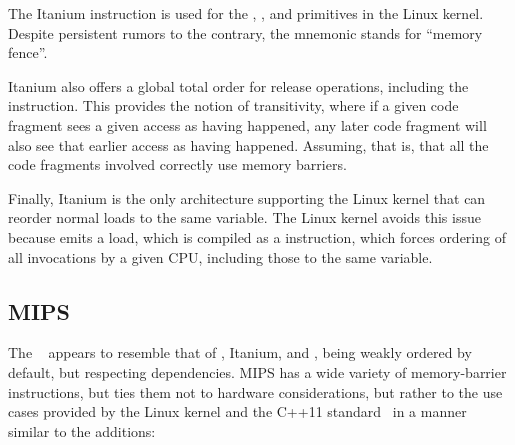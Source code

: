 The Itanium  instruction is used for the ,
, and  primitives in the Linux kernel.
Despite persistent rumors to the contrary, the  mnemonic stands
for ``memory fence''.

Itanium also offers a global total order for release operations,
including the  instruction.
This provides the notion of transitivity, where if a given code fragment
sees a given access as having happened, any later code fragment will
also see that earlier access as having happened.
Assuming, that is, that all the code fragments involved correctly use
memory barriers.

Finally, Itanium is the only architecture supporting the Linux kernel
that can reorder normal loads to the same variable.
The Linux kernel avoids this issue because  emits
a  load, which is compiled as a  instruction,
which forces ordering of all  invocations by a given
CPU, including those to the same variable.

\subsection{MIPS}

The ~\cite[page~479]{MIPSvII-A-2016}
appears to resemble that of \ARM, Itanium, and \Power{},
being weakly ordered by default, but respecting dependencies.
MIPS has a wide variety of memory-barrier instructions, but ties them
not to hardware considerations, but rather to the use cases provided
by the Linux kernel and the C++11 standard~\cite{RichardSmith2019N4800}
in a manner similar to the  additions:

